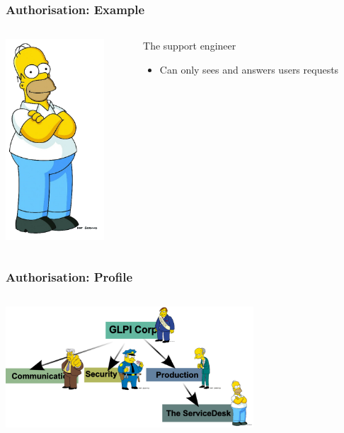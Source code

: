 \documentclass{beamer}
\begin{document}
\begin{frame}
\frametitle{Authorisation: Example}
\begin{columns}
 \begin{column}{0.45\textwidth}
         \includegraphics[height=7.5cm]{./pics/simpsons/homer.png}
 \end{column}
 \begin{column}{0.45\textwidth}
    \begin{block}{The support engineer}
        \begin{itemize}
            \item Can only sees and answers users requests
        \end{itemize}
    \end{block}
 \end{column}
\end{columns}
\end{frame}



\begin{frame}
\frametitle{Authorisation: Profile}
\begin{columns}
 \begin{column}{0.45\textwidth}
         \includegraphics[height=4.5cm]{./pics/entites-ppl.png}
 \end{column}
 \begin{column}{0.45\textwidth}
 \end{column}
\end{columns}
\end{frame}
\end{document}
